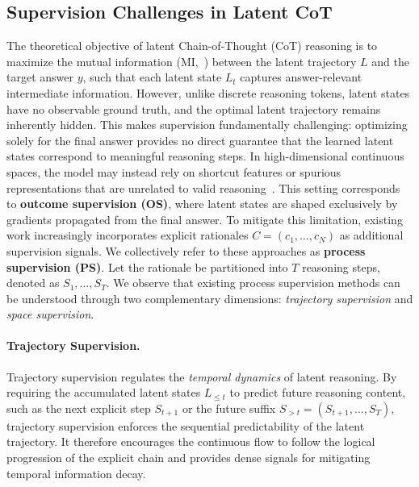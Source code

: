 \subsection{Supervision Challenges in Latent CoT}
\label{subsec:induction_dilemma}
The theoretical objective of latent Chain-of-Thought (CoT) reasoning is to maximize the mutual information (MI,~\citealt{MI}) between the latent trajectory $L$ and the target answer $y$, such that each latent state $L_t$ captures answer-relevant intermediate information. However, unlike discrete reasoning tokens, latent states have no observable ground truth, and the optimal latent trajectory remains inherently hidden. This makes supervision fundamentally challenging: optimizing solely for the final answer provides no direct guarantee that the learned latent states correspond to meaningful reasoning steps. In high-dimensional continuous spaces, the model may instead rely on shortcut features or spurious representations that are unrelated to valid reasoning~\citep{zhang2025latenttokensthinkcausal}. This setting corresponds to \textbf{outcome supervision (OS)}, where latent states are shaped exclusively by gradients propagated from the final answer.
To mitigate this limitation, existing work increasingly incorporates explicit rationales $C=(c_1,\ldots,c_N)$ as additional supervision signals. We collectively refer to these approaches as \textbf{process supervision (PS)}. Let the rationale be partitioned into $T$ reasoning steps, denoted as $S_1,\ldots,S_T$. We observe that existing process supervision methods can be understood through two complementary dimensions: \textit{trajectory supervision} and \textit{space supervision}.

\paragraph{Trajectory Supervision.}
Trajectory supervision regulates the \emph{temporal dynamics} of latent reasoning.
By requiring the accumulated latent states $L_{\le t}$ to predict future reasoning content, such as the next explicit step $S_{t+1}$ or the future suffix $S_{>t}=(S_{t+1},\ldots,S_T)$, trajectory supervision enforces the sequential predictability of the latent trajectory.
It therefore encourages the continuous flow to follow the logical progression of the explicit chain and provides dense signals for mitigating temporal information decay.

